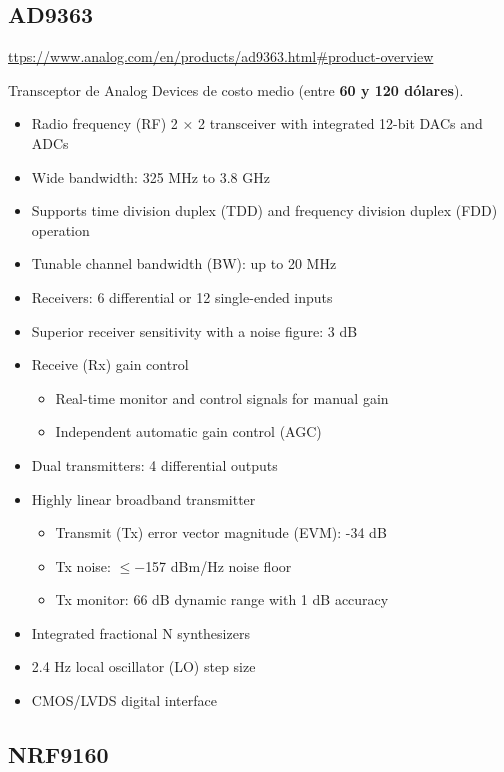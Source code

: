 \documentclass[a4paper,12pt]{report} %
\begin{document}
\subsection{AD9363}

\url{ttps://www.analog.com/en/products/ad9363.html#product-overview}

Transceptor de Analog Devices de costo medio (entre \textbf{60 y 120 dólares}). 

\begin{itemize}
	\item Radio frequency (RF) 2 × 2 transceiver with integrated 12-bit DACs and ADCs
	\item Wide bandwidth: 325 MHz to 3.8 GHz
	\item Supports time division duplex (TDD) and frequency division duplex (FDD) operation
	\item Tunable channel bandwidth (BW): up to 20 MHz
	\item Receivers: 6 differential or 12 single-ended inputs
	\item Superior receiver sensitivity with a noise figure: 3 dB
	\item Receive (Rx) gain control
	\begin{itemize}
		\item Real-time monitor and control signals for manual gain
		\item Independent automatic gain control (AGC)
	\end{itemize}
	\item Dual transmitters: 4 differential outputs
	\item Highly linear broadband transmitter
	\begin{itemize}
		\item Transmit (Tx) error vector magnitude (EVM): -34 dB
		\item Tx noise: $\leqslant-$157 dBm/Hz noise floor
		\item Tx monitor: 66 dB dynamic range with 1 dB accuracy
	\end{itemize}
	\item Integrated fractional N synthesizers
	\item 2.4 Hz local oscillator (LO) step size
	\item CMOS/LVDS digital interface
\end{itemize}

\subsection{NRF9160}
\end{document}
